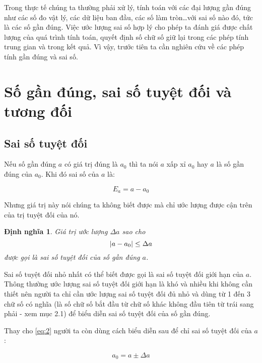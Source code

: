 \documentclass{book}    %
\DeclarePairedDelimiter\abs{\lvert}{\rvert}%
\newtheorem{definition}{Định nghĩa}
\begin{document}
Trong thực tế chúng ta thường phải xử lý, tính toán với các đại lượng gần đúng
như các số đo vật lý, các dữ liệu ban đầu, các số làm tròn…với sai số nào đó,
tức là các số gần đúng. Việc ước lượng sai số hợp lý cho phép ta đánh giá được
chất lượng của quá trình tính toán, quyết định số chữ số giữ lại trong các phép
tính trung gian và trong kết quả. Vì vậy, trước tiên ta cần nghiên cứu về các
phép tính gần đúng và sai số.

\section{Số gần đúng, sai số tuyệt đối và tương đối}

\subsection{Sai số tuyệt đối}

Nếu số gần đúng \(a\) có giá trị đúng là \(a_0\) thì ta nói \(a\) xấp xỉ \(a_0\)
hay \(a\) là số gần đúng của \(a_0\). Khi đó sai số của \(a\) là:

\begin{equation} \label{eq:1}
    E_a = a - a_0
\end{equation}

Nhưng giá trị này nói chúng ta không biết được mà chỉ ước lượng được cận trên
của trị tuyệt đối của nó.

\begin{definition}
    Giá trị ước lượng \(\Delta a\) sao cho
    \begin{equation} \label{eq:2}
        \abs{a - a_0} \leq \Delta a
    \end{equation}
    được gọi là \emph{sai số tuyệt đối} của số gần đúng \(a\).
\end{definition}

Sai số tuyệt đối nhỏ nhất có thể biết được gọi là sai số tuyệt đối giới hạn của
\(a\). Thông thường ước lượng sai số tuyệt đối giới hạn là khó và nhiều khi
không cần thiết nên người ta chỉ cần ước lượng sai số tuyệt đối đủ nhỏ và dùng
từ 1 đến 3 chữ số có nghĩa (là số chữ số bắt đầu từ chữ số khác không đầu tiên
từ trái sang phải - xem mục 2.1) để biểu diễn sai số tuyệt đối của số gần đúng.

Thay cho \ref{eq:2} người ta còn dùng cách biểu diễn sau để chỉ sai số tuyệt đối
của \(a\):

\begin{equation} \label{eq:3}
    a_0 = a \pm \Delta a
\end{equation}
\end{document}
